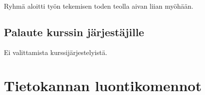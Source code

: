 \documentclass[a4paper,twoside,titlepage,12pt]{article}
\begin{document}
Ryhmä aloitti työn tekemisen toden teolla aivan liian myöhään.

\subsection{Palaute kurssin järjestäjille}

Ei valittamista kurssijärjestelyistä.

%
%
% 
\newpage
\section*{Tietokannan luontikomennot}


\end{document}
